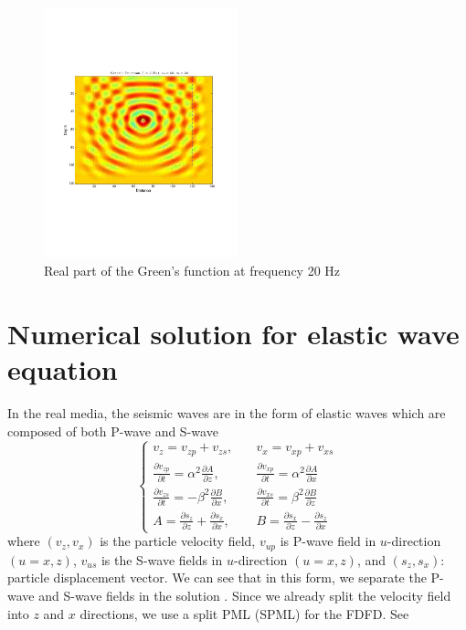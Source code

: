 \documentclass[11pt]{article}
\theoremstyle{plain}
\theoremstyle{definition}
\theoremstyle{remark}
\numberwithin{equation}{section}
\begin{document}
  \begin{figure}
  \centering
  \includegraphics[width=0.5\textwidth]{Fig/GreensFunction.pdf}
  \caption{Real part of the Green's function at frequency 20 Hz} 
  \end{figure}


\section{Numerical solution for elastic wave equation}
In the real media, the seismic waves are in the form of elastic waves which are composed of both P-wave and S-wave
\begin{equation}
    \left\{
    \begin{aligned}
    v_z=v_{zp}+v_{zs}, \quad &v_x=v_{xp}+v_{xs}\\
    \frac{\partial v_{zp}}{\partial t}=\alpha^2 \frac{\partial A}{\partial z}, \quad &\frac{\partial v_{xp}}{\partial t}=\alpha^2 \frac{\partial A}{\partial x}\\
    \frac{\partial v_{zs}}{\partial t}=-\beta^2 \frac{\partial B}{\partial x}, \quad &\frac{\partial v_{xs}}{\partial t}=\beta^2 \frac{\partial B}{\partial z}\\
    A=\frac{\partial s_z}{\partial z}+\frac{\partial s_x}{\partial x}, \quad &B=\frac{\partial s_x}{\partial z}-\frac{\partial s_z}{\partial x}
    \end{aligned}
    \right.
    \end{equation}
where $(v_z, v_x)$ is the particle velocity field, $v_{up}$ is P-wave field in $u$-direction $(u=x, z)$,
  $v_{us}$ is the S-wave fields in $u$-direction $(u=x, z)$, and $(s_z, s_x)$: particle displacement vector.
  We can see that in this form, we separate the P-wave and S-wave fields in the solution \cite{Che2014}. Since 
  we already split the velocity field into $z$ and $x$ directions, we use a split PML (SPML) for the FDFD. See 
    
\end{document}
